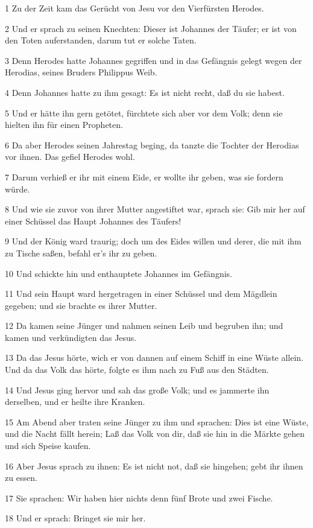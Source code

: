 \par 1 Zu der Zeit kam das Gerücht von Jesu vor den Vierfürsten Herodes.
\par 2 Und er sprach zu seinen Knechten: Dieser ist Johannes der Täufer; er ist von den Toten auferstanden, darum tut er solche Taten.
\par 3 Denn Herodes hatte Johannes gegriffen und in das Gefängnis gelegt wegen der Herodias, seines Bruders Philippus Weib.
\par 4 Denn Johannes hatte zu ihm gesagt: Es ist nicht recht, daß du sie habest.
\par 5 Und er hätte ihn gern getötet, fürchtete sich aber vor dem Volk; denn sie hielten ihn für einen Propheten.
\par 6 Da aber Herodes seinen Jahrestag beging, da tanzte die Tochter der Herodias vor ihnen. Das gefiel Herodes wohl.
\par 7 Darum verhieß er ihr mit einem Eide, er wollte ihr geben, was sie fordern würde.
\par 8 Und wie sie zuvor von ihrer Mutter angestiftet war, sprach sie: Gib mir her auf einer Schüssel das Haupt Johannes des Täufers!
\par 9 Und der König ward traurig; doch um des Eides willen und derer, die mit ihm zu Tische saßen, befahl er's ihr zu geben.
\par 10 Und schickte hin und enthauptete Johannes im Gefängnis.
\par 11 Und sein Haupt ward hergetragen in einer Schüssel und dem Mägdlein gegeben; und sie brachte es ihrer Mutter.
\par 12 Da kamen seine Jünger und nahmen seinen Leib und begruben ihn; und kamen und verkündigten das Jesus.
\par 13 Da das Jesus hörte, wich er von dannen auf einem Schiff in eine Wüste allein. Und da das Volk das hörte, folgte es ihm nach zu Fuß aus den Städten.
\par 14 Und Jesus ging hervor und sah das große Volk; und es jammerte ihn derselben, und er heilte ihre Kranken.
\par 15 Am Abend aber traten seine Jünger zu ihm und sprachen: Dies ist eine Wüste, und die Nacht fällt herein; Laß das Volk von dir, daß sie hin in die Märkte gehen und sich Speise kaufen.
\par 16 Aber Jesus sprach zu ihnen: Es ist nicht not, daß sie hingehen; gebt ihr ihnen zu essen.
\par 17 Sie sprachen: Wir haben hier nichts denn fünf Brote und zwei Fische.
\par 18 Und er sprach: Bringet sie mir her.
